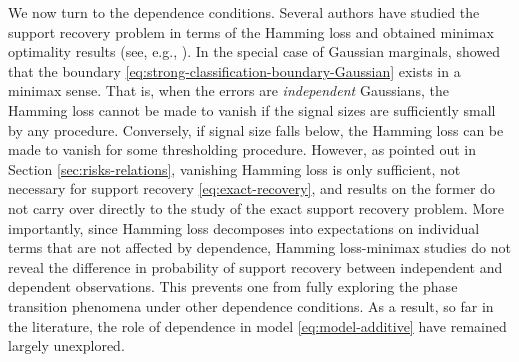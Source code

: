 
\medskip

We now turn to the dependence conditions.
Several authors have studied the support recovery problem in terms of the Hamming loss and obtained minimax optimality results (see, e.g., \cite{ji2012ups, genovese2012comparison, jin2014optimality, butucea2018variable}).
In the special case of Gaussian marginals, \cite{butucea2018variable} showed that the boundary \eqref{eq:strong-classification-boundary-Gaussian} exists in a minimax sense.
That is, when the errors are \emph{independent} Gaussians, the Hamming loss cannot be made to vanish if the signal sizes are sufficiently small by any procedure. 
Conversely, if signal size falls below, the Hamming loss can be made to vanish for some thresholding procedure.
%
However, as pointed out in Section \ref{sec:risks-relations}, vanishing Hamming loss is only sufficient, not necessary for support recovery \eqref{eq:exact-recovery}, and results on the former do not carry over directly to the study of the exact support recovery problem.
More importantly, since Hamming loss decomposes into expectations on individual terms that are not affected by dependence, Hamming loss-minimax studies do not reveal the difference in probability of support recovery between independent and dependent observations. 
This prevents one from fully exploring the phase transition phenomena under other dependence conditions.
As a result, so far in the literature, the role of dependence in model \eqref{eq:model-additive} have remained largely unexplored. 

